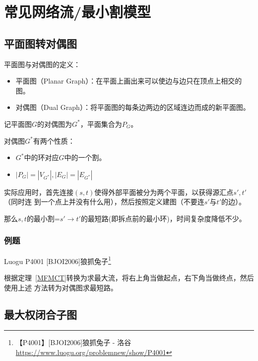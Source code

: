 \section{常见网络流/最小割模型}
\subsection{平面图转对偶图}

平面图与对偶图的定义：
\begin{itemize}
	\item 平面图（Planar Graph）：在平面上画出来可以使边与边只在顶点上相交的图。
	\item 对偶图（Dual Graph）：将平面图的每条边两边的区域连边而成的新平面图。
\end{itemize}

记平面图$G$的对偶图为$G^*$，平面集合为$P_G$。

对偶图$G^*$有两个性质：
\begin{itemize}
	\item
	      \begin{property}
		      $G^*$中的环对应$G$中的一个割。
	      \end{property}
	\item
	      \begin{property}
		      $|P_G|=|V_{G^*}|,|E_G|=|E_{G^*}|$
	      \end{property}
\end{itemize}

实际应用时，首先连接$(s,t)$使得外部平面被分为两个平面，以获得源汇点$s',t'$（同时连
到一个点上并没有什么用），然后按照定义建图（不要连$s'$与$t'$的边）。

那么$s,t$的最小割=$s'\rightarrow t'$的最短路(即拆点前的最小环)，时间复杂度降低不少。

\subsubsection{例题}

Luogu P4001 [BJOI2006]狼抓兔子\footnote{【P4001】[BJOI2006]狼抓兔子 - 洛谷
\url{https://www.luogu.org/problemnew/show/P4001}}

根据定理~\ref{MFMCT}转换为求最大流，将右上角当做起点，右下角当做终点，然后使用上述
方法转为对偶图求最短路。



\subsection{最大权闭合子图}

